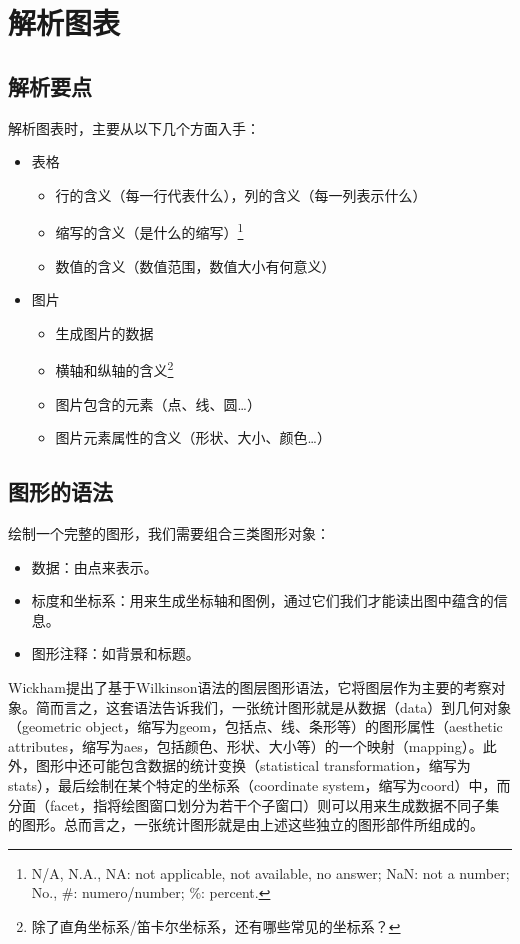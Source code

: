 \documentclass[11pt,a4paper,twoside]{book}
\begin{document}
\section{解析图表}
\subsection{解析要点}
解析图表时，主要从以下几个方面入手：
\begin{itemize}
  \item 表格
    \begin{itemize}
      \item 行的含义（每一行代表什么），列的含义（每一列表示什么）
      \item 缩写的含义（是什么的缩写）\footnote{N/A, N.A., NA: not applicable, not available, no answer; NaN: not a number; No., \#: numero/number; \%: percent.}
      \item 数值的含义（数值范围，数值大小有何意义）
    \end{itemize}
  \item 图片
    \begin{itemize}
      \item 生成图片的数据
      \item 横轴和纵轴的含义\footnote{除了直角坐标系/笛卡尔坐标系，还有哪些常见的坐标系？}
      \item 图片包含的元素（点、线、圆\ldots）
      \item 图片元素属性的含义（形状、大小、颜色\ldots）
    \end{itemize}
\end{itemize}

\subsection{图形的语法}
绘制一个完整的图形，我们需要组合三类图形对象：
\begin{itemize}
  \item 数据：由点来表示。
  \item 标度和坐标系：用来生成坐标轴和图例，通过它们我们才能读出图中蕴含的信息。
  \item 图形注释：如背景和标题。
\end{itemize}

Wickham提出了基于Wilkinson语法的图层图形语法，它将图层作为主要的考察对象。简而言之，这套语法告诉我们，一张统计图形就是从数据（data）到几何对象（geometric object，缩写为geom，包括点、线、条形等）的图形属性（aesthetic attributes，缩写为aes，包括颜色、形状、大小等）的一个映射（mapping）。此外，图形中还可能包含数据的统计变换（statistical transformation，缩写为stats），最后绘制在某个特定的坐标系（coordinate system，缩写为coord）中，而分面（facet，指将绘图窗口划分为若干个子窗口）则可以用来生成数据不同子集的图形。总而言之，一张统计图形就是由上述这些独立的图形部件所组成的。
\end{document}
